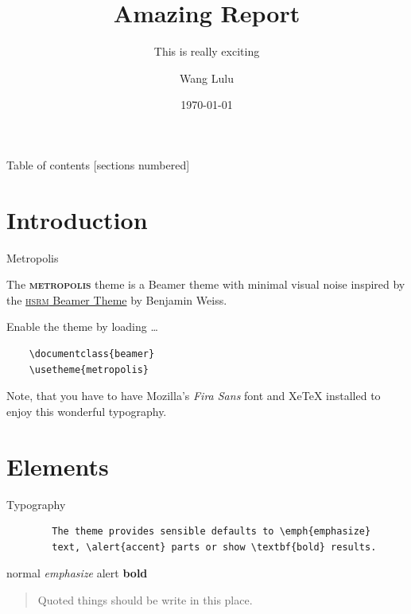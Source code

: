 \documentclass[10pt]{beamer}
\title{Amazing Report}
\subtitle{This is really exciting}
\date{\today}
\author{Wang Lulu}
\institute{Peking University}
\newcommand{\themename}{\textbf{\textsc{metropolis}}\xspace}
\begin{document}
\maketitle


\begin{frame}{Table of contents}
  [sections numbered]
  \tableofcontents[hideallsubsections]
\end{frame}



\section{Introduction}



\begin{frame}[fragile]{Metropolis}

  The \themename theme is a Beamer theme with minimal visual noise
  inspired by the \href{https://github.com/hsrmbeamertheme/hsrmbeamertheme}{\textsc{hsrm} Beamer
  Theme} by Benjamin Weiss.

  Enable the theme by loading \ldots

  \begin{verbatim}    
	\documentclass{beamer}
	\usetheme{metropolis}
  \end{verbatim}

  Note, that you have to have Mozilla's \emph{Fira Sans} font and XeTeX
  installed to enjoy this wonderful typography.
\end{frame}



\section{Elements}



\begin{frame}[fragile]{Typography}
	\begin{verbatim}
		The theme provides sensible defaults to \emph{emphasize} 
		text, \alert{accent} parts or show \textbf{bold} results.
	\end{verbatim}

	\begin{center}
		normal
		\emph{emphasize}
		\alert{alert}
		\textbf{bold}
	\end{center}
	
	\begin{quote}
    Quoted things should be write in this place.
  	\end{quote}

\end{frame}
\end{document}

